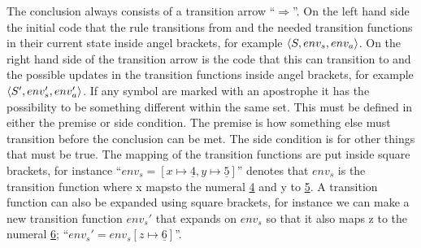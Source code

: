 The conclusion always consists of a transition arrow \enquote{$\Rightarrow$}. On the left hand side the initial code that the rule transitions from and the needed transition functions in their current state inside angel brackets, for example $\Braket{S,env_s,env_a}$. On the right hand side of the transition arrow is the code that this can transition to and the possible updates in the transition functions inside angel brackets, for example $\Braket{S',env_s',env_a'}$. If any symbol are marked with an apostrophe it has the possibility to be something different within the same set. This must be defined in either the premise or side condition.
The premise is how something else must transition before the conclusion can be met. The side condition is for other things that must be true.
The mapping of the transition functions are put inside square brackets, for instance \enquote{$env_s = [x \mapsto \underline{4},y \mapsto \underline{5}]$} denotes that $env_s$ is the transition function where x mapsto the numeral \underline{4} and y to \underline{5}. A transition function can also be expanded using square brackets, for instance we can make a new transition function $env_s'$ that expands on $env_s$ so that it also maps z to the numeral \underline{6}; \enquote{$env_s' = env_s[z \mapsto \underline{6}]$}.







